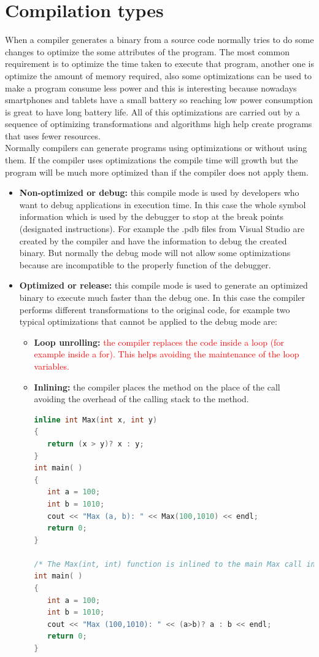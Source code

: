 \section{Compilation types}\label{S:PERF-comptypes}
When a compiler generates a binary from a source code normally tries to do some changes to optimize the some attributes of the program. The most common requirement is to optimize the time taken to execute that program, another one is optimize the amount of memory required, also some optimizations can be used to make a program consume less power and this is interesting because nowadays smartphones and tablets have a small battery so reaching low power consumption is great to have long battery life. All of this optimizations are carried out by a sequence of optimizing transformations and algorithms high help create programs that uses fewer resources.
\\
Normally compilers can generate programs using optimizations or without using them. If the compiler uses optimizations the compile time will growth but the program will be much more optimized than if the compiler does not apply them.
\begin{itemize}
  \item \textbf{Non-optimized or debug:} this compile mode is used by developers who want to debug applications in execution time. In this case the whole symbol information which is used by the debugger to stop at the break points (designated instructions). For example the .pdb files from Visual Studio are created by the compiler and have the information to debug the created binary. But normally the debug mode will not allow some optimizations because are incompatible to the properly function of the debugger.
  \item \textbf{Optimized or release:} this compile mode is used to generate an optimized binary to execute much faster than the debug one. In this case the compiler performs different transformations to the original code, for example two typical optimizations that cannot be applied to the debug mode are:
  \begin{itemize}
  	\item \textbf{Loop unrolling:} \textcolor{red}{the compiler replaces the code inside a loop (for example inside a for). This helps avoiding the maintenance of the loop variables.}
  	\item \textbf{Inlining:} the compiler places the method on the place of the call avoiding the overhead of the calling stack to the method.
  	\begin{lstlisting}[language=C++, caption={Inline example}]
inline int Max(int x, int y)
{
   return (x > y)? x : y;
}
int main( )
{
   int a = 100;
   int b = 1010;
   cout << "Max (a, b): " << Max(100,1010) << endl;
   return 0;
}

/* The Max(int, int) function is inlined to the main Max call in the following way:*/
int main( )
{
   int a = 100;
   int b = 1010;
   cout << "Max (100,1010): " << (a>b)? a : b << endl;
   return 0;
}
\end{lstlisting}
  \end{itemize}
\end{itemize}

